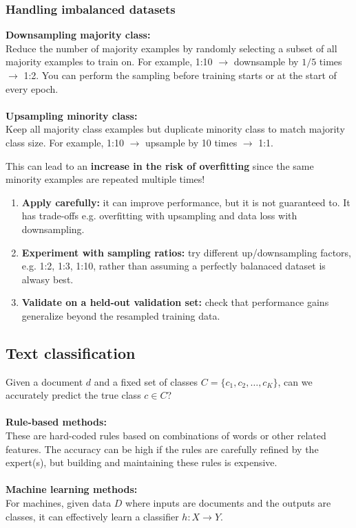 \documentclass[11pt]{article}
\begin{document}
\subsubsection{Handling imbalanced datasets}
\textbf{Downsampling majority class:} \\
Reduce the number of majority examples by randomly selecting a subset of all majority examples to train on. For example, 1:10 $\to$ downsample by $1/5$ times $\to$ 1:2.
You can perform the sampling before training starts or at the start of every epoch.
\\\\
\textbf{Upsampling minority class:} \\
Keep all majority class examples but duplicate minority class to match majority class size. For example, 1:10 $\to$ upsample by 10 times $\to$ 1:1.
\begin{warning}[Warning]
This can lead to an \textbf{increase in the risk of overfitting} since the same minority examples are repeated multiple times!
\end{warning}
\begin{note}
\begin{enumerate}
    \item \textbf{Apply carefully:} it can improve performance, but it is not guaranteed to. It has trade-offs e.g. overfitting with upsampling and data loss with downsampling.
    \item \textbf{Experiment with sampling ratios:} try different up/downsampling factors, e.g. 1:2, 1:3, 1:10, rather than assuming a perfectly balanaced dataset is alwasy best.
    \item \textbf{Validate on a held-out validation set:} check that performance gains generalize beyond the resampled training data.
\end{enumerate}
\end{note}

\subsection{Text classification}
Given a document $d$ and a fixed set of classes $C=\{c_1,c_2,\dots,c_K\}$, can we accurately predict the true class $c\in C$? \\\\
\textbf{Rule-based methods:}\\
These are hard-coded rules based on combinations of words or other related features. The accuracy can be high if the rules are carefully refined by the expert(s), but building and maintaining these rules is expensive. \\\\
\textbf{Machine learning methods:} \\
For machines, given data $D$ where inputs are documents and the outputs are classes, it can effectively learn a classifier $h:X\to Y$.
\end{document}
